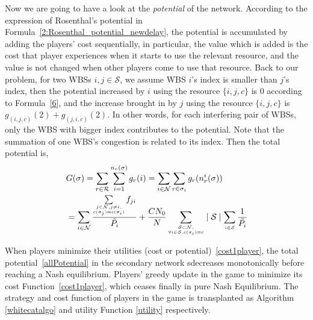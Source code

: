 \documentclass[times]{ettauth}
\theoremstyle{mytheoremstyle}
\theoremstyle{mytheoremstyle}
\theoremstyle{mytheoremstyle}
\begin{document}
Now we are going to have a look at the \textit{potential} of the network.
According to the expression of Rosenthal's potential in Formula~\ref{2:Rosenthal_potential_newdelay}, the potential is accumulated by adding the players' cost sequentially, in particular, the value which is added is the cost that player experiences when it starts to use the relevant resource, and the value is not changed when other players come to use that resource.
Back to our problem, for two WBSs $i,j\in \mathcal{S}$, we assume WBS $i$'s index is smaller than $j$'s index, then the potential increased by $i$ using the resource $\{i,j,c\}$ is 0 according to Formula~\ref{6}, and the increase brought in by $j$ using the resource $\{i,j,c\}$ is $g_{(i,j,c)}(2)+g_{(j,i,c)}(2)$. 
In other words, for each interfering pair of WBSs, only the WBS with bigger index contributes to the potential. 
Note that the summation of one WBS's congestion is related to its index. 
Then the total potential is, 
\begin{equation}
\label{allPotential}
\begin{split}	
&G(\sigma) 
 =\sum\limits^{}_{r\in \mathcal{R}} \sum\limits^{n_r(\sigma)}_{i=1} g_r(i)  =\sum\limits_{i\in \mathcal{N}} \sum\limits^{}_{r\in \sigma_i} g_r(n_r^i(\sigma))\\
& = \sum\limits_{i\in \mathcal{N}}\dfrac{\sum\limits_{\tiny\substack{j\in \mathcal{N}, j\ne i,\\ c(\sigma_j)=c(\sigma_i)}}f_{ji}}{\tilde{P_i}} + \dfrac{CN_0}{N}\sum\limits_{\tiny\substack{\mathcal{S}\subset \mathcal{N},\\ \forall i\in \mathcal{S}, c(\sigma_i)=c}} \mid \mathcal{S}\mid   \sum\limits_{\tiny\substack{i\in \mathcal{S}}}\frac{1}{\tilde{P_i}}
\end{split}
\end{equation}


When players minimize their utilities (cost or potential)~\ref{cost1player}, the total potential~\ref{allPotential} in the secondary network sdecreases monotonically before reaching a Nash equilibrium. 
Players' greedy update in the game to minimize its cost Function~\ref{cost1player}, which ceases finally in pure Nash Equilibrium. The strategy and cost function of players in the game is transplanted as Algorithm \ref{whitecatalgo} and utility Function \ref{utility} respectively.
\end{document}
